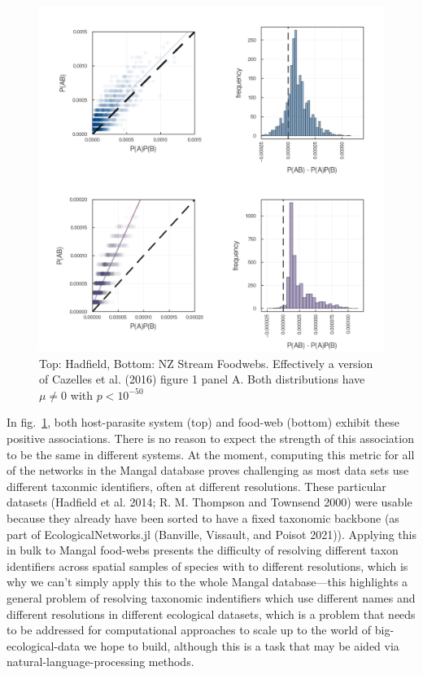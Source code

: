 \documentclass[10pt,oneside]{article}
\makeatletter
\def\maxwidth{\ifdim\Gin@nat@width>\linewidth\linewidth
\else\Gin@nat@width\fi}
\let\Oldincludegraphics\includegraphics
\renewcommand{\includegraphics}[1]{\Oldincludegraphics[width=\maxwidth]{#1}}
\makeatother
\begin{document}
\begin{figure}
\hypertarget{fig:associations}{%
\centering
\includegraphics{./figures/positiveassociations.png}
\caption{Top: Hadfield, Bottom: NZ Stream Foodwebs. Effectively a
version of Cazelles et al. (2016) figure 1 panel A. Both distributions
have \(\mu \neq 0\) with \(p < 10^{-50}\)}\label{fig:associations}
}
\end{figure}

In fig.~\ref{fig:associations}, both host-parasite system (top) and
food-web (bottom) exhibit these positive associations. There is no
reason to expect the strength of this association to be the same in
different systems. At the moment, computing this metric for all of the
networks in the Mangal database proves challenging as most data sets use
different taxonmic identifiers, often at different resolutions. These
particular datasets (Hadfield et al. 2014; R. M. Thompson and Townsend
2000) were usable because they already have been sorted to have a fixed
taxonomic backbone (as part of EcologicalNetworks.jl (Banville,
Vissault, and Poisot 2021)). Applying this in bulk to Mangal food-webs
presents the difficulty of resolving different taxon identifiers across
spatial samples of species with to different resolutions, which is why
we can't simply apply this to the whole Mangal database---this
highlights a general problem of resolving taxonomic indentifiers which
use different names and different resolutions in different ecological
datasets, which is a problem that needs to be addressed for
computational approaches to scale up to the world of big-ecological-data
we hope to build, although this is a task that may be aided via
natural-language-processing methods.
\end{document}
